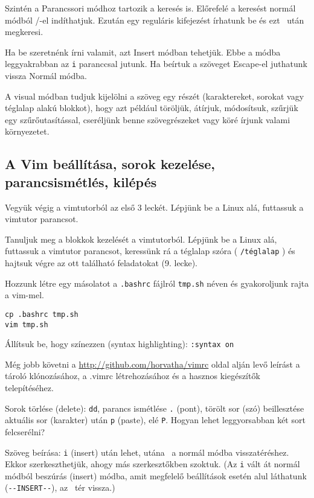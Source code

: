 \documentclass[a4paper]{article}
\newcommand{\code}{\texttt}
\newcommand{\Esc}{\framebox{\texttt{Esc}}}
\newcommand{\Enter}{\framebox{\texttt{Enter}}}
\begin{document}
Szintén a Parancssori módhoz tartozik a keresés is. Előrefelé a keresést
normál módból /-el indíthatjuk. Ezután egy reguláris kifejezést írhatunk
be és ezt \Enter\ után megkeresi.

Ha be szeretnénk írni valamit, azt Insert módban tehetjük. Ebbe a módba
leggyakrabban az \verb!i! paranccsal jutunk. Ha beírtuk a szöveget
Escape-el juthatunk vissza Normál módba.

A visual módban tudjuk kijelölni a szöveg egy részét (karaktereket,
sorokat vagy téglalap alakú blokkot), hogy azt például töröljük,
átírjuk, módosítsuk, szűrjük egy szűrőutasítással, cseréljünk benne
szövegrészeket vagy köré írjunk valami környezetet.

\subsection{A Vim beállítása, sorok kezelése, parancsismétlés, kilépés}

Vegyük végig a vimtutorból az első 3 leckét.
Lépjünk be a Linux alá, futtassuk a vimtutor parancsot.

Tanuljuk meg a blokkok kezelését a vimtutorból.
Lépjünk be a Linux alá, futtassuk a vimtutor parancsot,
keressünk rá a téglalap szóra ( \code{/téglalap} ) és hajtsuk végre az
ott található feladatokat (9. lecke).

Hozzunk létre egy másolatot a \code{.bashrc} fájlról \code{tmp.sh} néven és
gyakoroljunk rajta a vim-mel.
\begin{Verbatim}
cp .bashrc tmp.sh
vim tmp.sh
\end{Verbatim}

Állítsuk be, hogy színezzen (syntax highlighting): \code{:syntax on}

Még jobb követni a \url{http://github.com/horvatha/vimrc} oldal alján
levő leírást a tároló klónozásához, a .vimrc létrehozásához és a hasznos
kiegészítők telepítéséhez.

Sorok törlése (delete): \code{dd}, parancs ismétlése \verb+.+ (pont),
törölt sor (szó) beillesztése aktuális sor (karakter) után \code{p}
(paste), elé \code{P}.
Hogyan lehet leggyorsabban két sort felcserélni?

Szöveg beírása: \code{i} (insert) után lehet, utána \Esc\ a normál módba
visszatéréshez. Ekkor szerkeszthetjük, ahogy más szerkesztőkben szoktuk.
(Az \code{i} vált át normál módból beszúrás (insert) módba, amit
megfelelő beállítások esetén alul láthatunk (\verb+--INSERT--+), az
\Esc\ tér vissza.)
\end{document}
